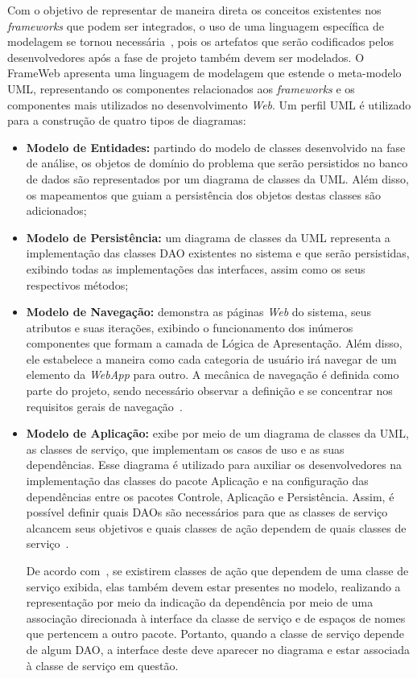 Com o objetivo de representar de maneira direta os conceitos existentes nos \textit{frameworks} que podem ser integrados, o uso de uma linguagem específica de modelagem se tornou necessária~\cite{martins-souza:webmedia15}, pois os artefatos que serão codificados pelos desenvolvedores após a fase de projeto também devem ser modelados. O FrameWeb apresenta uma linguagem de modelagem que estende o meta-modelo UML, representando os componentes relacionados aos \textit{frameworks} e os componentes mais utilizados no desenvolvimento \textit{Web}. Um perfil UML é utilizado para a construção de quatro tipos de diagramas: 

\begin{itemize}  

	\item \textbf{Modelo de Entidades:} partindo do modelo de classes desenvolvido na fase de análise, os objetos de domínio do problema que serão persistidos no banco de dados são representados por um diagrama de classes da UML. Além disso, os mapeamentos que guiam a persistência dos objetos destas classes são adicionados;
	
	\item \textbf{Modelo de Persistência:} um diagrama de classes da UML representa a implementação das classes DAO existentes no sistema e que serão persistidas, exibindo todas as implementações das interfaces, assim como os seus respectivos métodos;
	
	\item \textbf{Modelo de Navegação:} demonstra as páginas \textit{Web} do sistema, seus atributos e suas iterações, exibindo o funcionamento dos inúmeros componentes que formam a camada de Lógica de Apresentação. Além disso, ele estabelece a maneira como cada categoria de usuário irá navegar de um elemento da \textit{WebApp} para outro. A mecânica de navegação é definida como parte do projeto, sendo necessário observar a definição e se concentrar nos requisitos gerais de navegação~\cite{pressman:es11}.	
	
	\item \textbf{Modelo de Aplicação:} exibe por meio de um diagrama de classes da UML, as classes de serviço, que implementam os casos de uso e as suas dependências. Esse diagrama é utilizado para auxiliar os desenvolvedores na implementação das classes do pacote Aplicação e na configuração das dependências entre os pacotes Controle, Aplicação e Persistência. Assim, é possível definir quais DAOs são necessários para que as classes de serviço alcancem seus objetivos e quais classes de ação dependem de quais classes de serviço~\cite{souza:masterthesis07}.

De acordo com~, se existirem classes de ação que dependem de uma classe de serviço exibida, elas também devem estar presentes no modelo, realizando a representação por meio da indicação da dependência por meio de uma associação direcionada à interface da classe de serviço e de espaços de nomes que pertencem a outro pacote. Portanto, quando a classe de serviço depende de algum DAO, a interface deste deve aparecer no diagrama e estar associada à classe de serviço em questão.	

\end{itemize}

